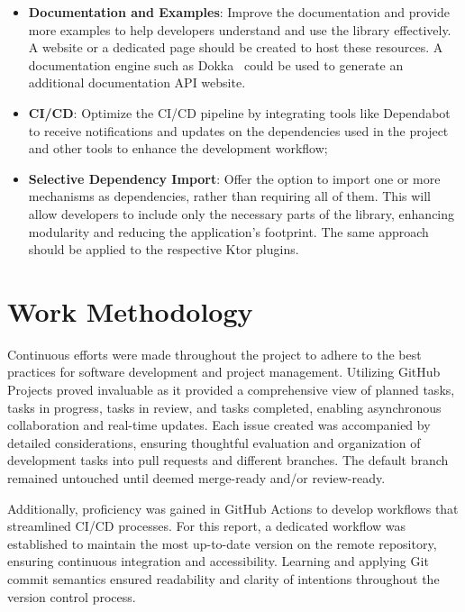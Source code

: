 \begin{itemize}
    \item \textbf{Documentation and Examples}:
    Improve the documentation
    and provide more examples to help developers understand and use the library effectively.
    A website or a dedicated page should be created
    to host these resources.
    A documentation engine such as Dokka~\cite{dokka} could be used to generate an additional documentation API website.
    \item \textbf{CI/CD}:
    Optimize the CI/CD pipeline by integrating tools like Dependabot~\cite{github-dependabot} to receive notifications and updates on the dependencies used in the project and other tools to enhance the development workflow;
    \item \textbf{Selective Dependency Import}:
    Offer the option to import one or more mechanisms as dependencies, rather than requiring all of them.
    This will allow developers to include only the necessary parts of the library, enhancing modularity and reducing the application's footprint.
    The same approach should be applied to the respective Ktor plugins.
\end{itemize}


\section{Work Methodology}\label{sec:work-methodology}

Continuous efforts were made throughout the project to adhere to the best practices for software development and project management.
Utilizing GitHub Projects proved invaluable as it provided a comprehensive view of planned tasks,
tasks in progress, tasks in review, and tasks completed, enabling asynchronous collaboration and real-time updates.
Each issue created was accompanied by detailed considerations,
ensuring thoughtful evaluation and organization of development tasks into pull requests and different branches.
The default branch remained untouched until deemed merge-ready and/or review-ready.

Additionally, proficiency was gained in GitHub Actions to develop workflows that streamlined CI/CD processes.
For this report, a dedicated workflow was established to maintain the most up-to-date version on the remote repository,
ensuring continuous integration and accessibility.
Learning and applying Git commit semantics ensured readability and clarity of intentions throughout the version control process.
